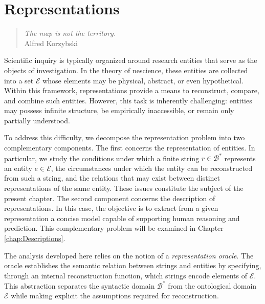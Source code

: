 %
%


\chapter{Representations}
\label{chap:representations}

\begin{quote}
\begin{flushright}
\emph{The map is not the territory.} \\
Alfred Korzybski
\end{flushright}
\end{quote}
\bigskip

Scientific inquiry is typically organized around research entities that serve as the objects of investigation. In the theory of nescience, these entities are collected into a set $\mathcal{E}$ whose elements may be physical, abstract, or even hypothetical. Within this framework, representations provide a means to reconstruct, compare, and combine such entities. However, this task is inherently challenging: entities may possess infinite structure, be empirically inaccessible, or remain only partially understood.

To address this difficulty, we decompose the representation problem into two complementary components. The first concerns the representation of entities. In particular, we study the conditions under which a finite string $r \in \mathcal{B}^\ast$ represents an entity $e \in \mathcal{E}$, the circumstances under which the entity can be reconstructed from such a string, and the relations that may exist between distinct representations of the same entity. These issues constitute the subject of the present chapter. The second component concerns the description of representations. In this case, the objective is to extract from a given representation a concise model capable of supporting human reasoning and prediction. This complementary problem will be examined in Chapter \ref{chap:Descriptions}.

The analysis developed here relies on the notion of a \emph{representation oracle}. The oracle establishes the semantic relation between strings and entities by specifying, through an internal reconstruction function, which strings encode elements of $\mathcal{E}$. This abstraction separates the syntactic domain $\mathcal{B}^\ast$ from the ontological domain $\mathcal{E}$ while making explicit the assumptions required for reconstruction.

